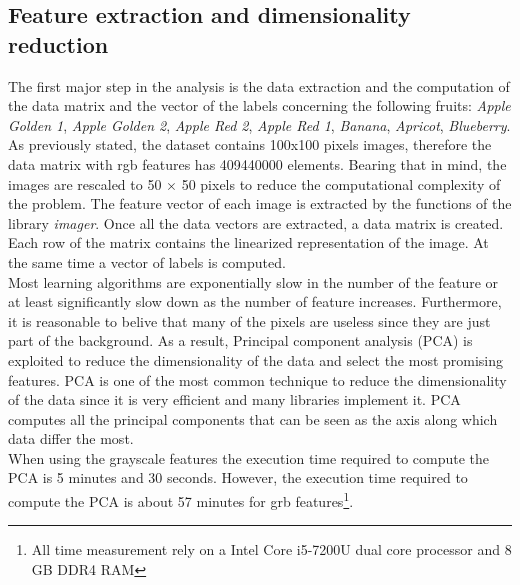 \documentclass{article}
\begin{document}
\subsection{Feature extraction and dimensionality reduction}
The first major step in the analysis is the data extraction and the computation of the data matrix and the vector of the labels concerning the following fruits: \textit{Apple Golden 1}, \textit{Apple Golden 2}, \textit{Apple Red 2}, \textit{Apple Red 1}, \textit{Banana}, \textit{Apricot}, \textit{Blueberry}. \\
As previously stated, the dataset contains 100x100 pixels images, therefore the data matrix with rgb features has 409440000 elements. Bearing that in mind, the images are rescaled to 50 $\times$ 50 pixels to reduce the computational complexity of the problem. 
The feature vector of each image is extracted by the functions of the library \textit{imager}. Once all the data vectors are extracted, a data matrix is created. Each row of the matrix contains the linearized representation of the image. At the same time a vector of labels is computed.\\
Most learning algorithms are exponentially slow in the number of the feature or at least significantly slow down as the number of feature increases. Furthermore, it is reasonable to belive that many of the pixels are useless since they are just part of the background. As a result, Principal component analysis (PCA) is exploited to reduce the dimensionality of the data and select the most promising features. PCA is one of the most common technique to reduce the dimensionality of the data since it is very efficient and many libraries implement it. PCA computes all the principal components that can be seen as the axis along which data differ the most. \\
When using the grayscale features the execution time required to compute the PCA is 5 minutes and 30 seconds. However, the execution time required to compute the PCA is about 57 minutes for grb features\footnote{All time measurement rely on a Intel Core i5-7200U dual core processor and 8 GB DDR4 RAM}.
\end{document}
